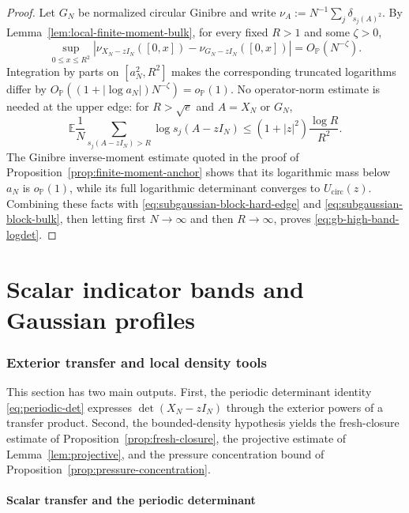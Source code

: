 \documentclass[11pt,reqno]{amsart}
\numberwithin{equation}{section}
\theoremstyle{definition}
\theoremstyle{remark}
\newcommand{\E}{\mathbb E}
\newcommand{\Pp}{\mathbb P}
\newcommand{\1}{\mathbf 1}
\newcommand{\cir}{\mathrm{circ}}
\begin{document}
\begin{proof}
Let $G_N$ be normalized circular Ginibre and write
$\nu_A:=N^{-1}\sum_j\delta_{s_j(A)^2}$.  By
Lemma~\ref{lem:local-finite-moment-bulk}, for every fixed $R>1$ and some
$\zeta>0$,
\begin{equation}
 \sup_{0\le x\le R^2}
 |\nu_{X_N-zI_N}([0,x])-\nu_{G_N-zI_N}([0,x])|
 =O_{\Pp}(N^{-\zeta}).
 \label{eq:subgaussian-block-bulk}
\end{equation}
Integration by parts on $[a_N^2,R^2]$ makes the corresponding truncated
logarithms differ by
$O_{\Pp}((1+|\log a_N|)N^{-\zeta})=o_{\Pp}(1)$.
No operator-norm estimate is needed at the upper edge: for $R>\sqrt e$
and $A=X_N$ or $G_N$,
\begin{equation}
 \E\frac1N\sum_{s_j(A-zI_N)>R}\log s_j(A-zI_N)
 \le (1+|z|^2)\frac{\log R}{R^2}.
 \label{eq:subgaussian-block-upper-tail}
\end{equation}
The Ginibre inverse-moment estimate quoted in the proof of
Proposition~\ref{prop:finite-moment-anchor} shows that its logarithmic
mass below $a_N$ is $o_{\Pp}(1)$, while its full logarithmic determinant
converges to $U_{\cir}(z)$.  Combining these facts with
\eqref{eq:subgaussian-block-hard-edge} and
\eqref{eq:subgaussian-block-bulk}, then letting first $N\to\infty$ and
then $R\to\infty$, proves \eqref{eq:gb-high-band-logdet}.
\end{proof}

\part{Scalar indicator bands and Gaussian profiles}

\section{Exterior transfer and local density tools}
This section has two main outputs.  First, the periodic determinant identity
\eqref{eq:periodic-det} expresses $\det(X_N-zI_N)$ through the exterior
powers of a transfer product.  Second, the bounded-density hypothesis yields
the fresh-closure estimate of Proposition~\ref{prop:fresh-closure}, the
projective estimate of Lemma~\ref{lem:projective}, and the pressure
concentration bound of Proposition~\ref{prop:pressure-concentration}.
\subsection{Scalar transfer and the periodic determinant}
\label{sec:transfer}
\end{document}
